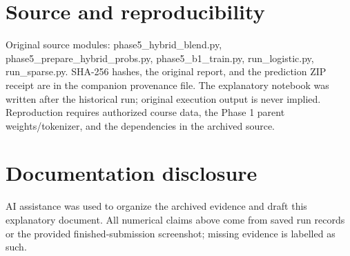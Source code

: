 \documentclass[11pt,a4paper]{article}
\begin{document}
\section*{Source and reproducibility}
Original source modules: phase5\_hybrid\_blend.py, phase5\_prepare\_hybrid\_probs.py, phase5\_b1\_train.py, run\_logistic.py, run\_sparse.py. SHA-256 hashes, the original report, and the prediction ZIP receipt are in the companion provenance file. The explanatory notebook was written after the historical run; original execution output is never implied. Reproduction requires authorized course data, the Phase 1 parent weights/tokenizer, and the dependencies in the archived source.
\section*{Documentation disclosure}
AI assistance was used to organize the archived evidence and draft this explanatory document. All numerical claims above come from saved run records or the provided finished-submission screenshot; missing evidence is labelled as such.
\end{document}
